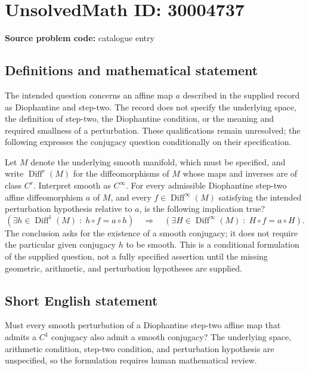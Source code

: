 \documentclass[11pt]{article}
\begin{document}
\section*{UnsolvedMath ID: 30004737}
\textbf{Source problem code:} catalogue entry
\subsection{Definitions and mathematical statement}
The intended question concerns an affine map \(a\) described in the supplied record as Diophantine and step-two. The record does not specify the underlying space, the definition of step-two, the Diophantine condition, or the meaning and required smallness of a perturbation. These qualifications remain unresolved; the following expresses the conjugacy question conditionally on their specification.

Let \(M\) denote the underlying smooth manifold, which must be specified, and write \(\operatorname{Diff}^{r}(M)\) for the diffeomorphisms of \(M\) whose maps and inverses are of class \(C^{r}\). Interpret smooth as \(C^{\infty}\). For every admissible Diophantine step-two affine diffeomorphism \(a\) of \(M\), and every \(f\in\operatorname{Diff}^{\infty}(M)\) satisfying the intended perturbation hypothesis relative to \(a\), is the following implication true?
\[
\left(\exists h\in\operatorname{Diff}^{1}(M)\;:\;h\circ f=a\circ h\right)
\quad\Longrightarrow\quad
\left(\exists H\in\operatorname{Diff}^{\infty}(M)\;:\;H\circ f=a\circ H\right).
\]
The conclusion asks for the existence of a smooth conjugacy; it does not require the particular given conjugacy \(h\) to be smooth. This is a conditional formulation of the supplied question, not a fully specified assertion until the missing geometric, arithmetic, and perturbation hypotheses are supplied.
\subsection{Short English statement}
Must every smooth perturbation of a Diophantine step-two affine map that admits a \(C^{1}\) conjugacy also admit a smooth conjugacy? The underlying space, arithmetic condition, step-two condition, and perturbation hypothesis are unspecified, so the formulation requires human mathematical review.
\end{document}
